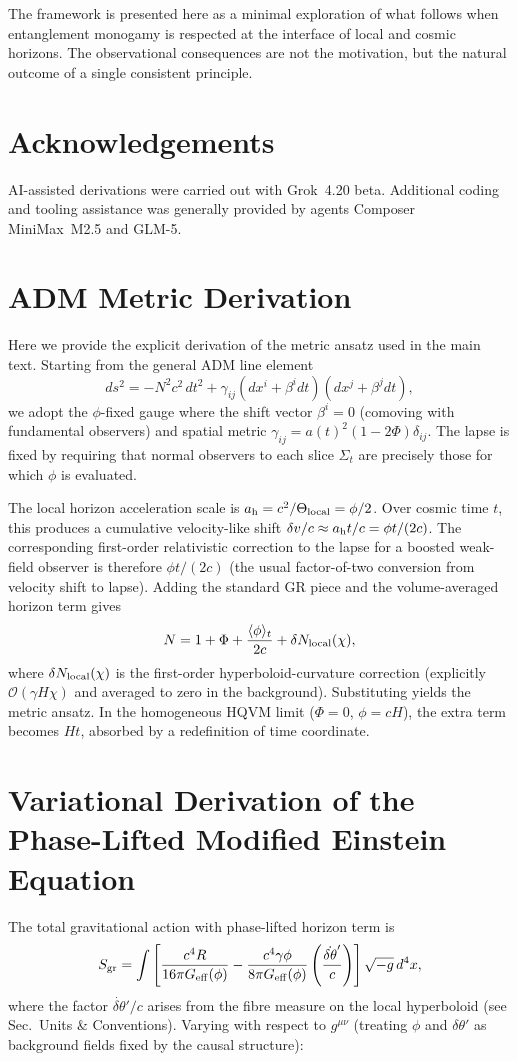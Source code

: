 \documentclass[12pt,a4paper]{article}
\begin{document}
The framework is presented here as a minimal exploration of what follows when entanglement monogamy is respected at the interface of local and cosmic horizons. The observational consequences are not the motivation, but the natural outcome of a single consistent principle.

\section*{Acknowledgements}
AI-assisted derivations were carried out with Grok~4.20 beta. Additional coding and tooling assistance was generally provided by agents  Composer MiniMax~M2.5 and GLM-5.

\appendix

\section{ADM Metric Derivation}
\label{app:adm}

Here we provide the explicit derivation of the metric ansatz used in the main text. Starting from the general ADM line element
\[
ds^2 = -N^2 c^2\,dt^2 + \gamma_{ij}(dx^i + \beta^i dt)(dx^j + \beta^j dt),
\]
we adopt the $\phi$-fixed gauge where the shift vector $\beta^i = 0$ (comoving with fundamental observers) and spatial metric $\gamma_{ij} = a(t)^2(1-2\Phi)\delta_{ij}$. The lapse is fixed by requiring that normal observers to each slice $\Sigma_t$ are precisely those for which $\phi$ is evaluated.

The local horizon acceleration scale is $a_{\rm h} = c^2/\Theta_{\rm local} = \phi/2$. Over cosmic time $t$, this produces a cumulative velocity-like shift $\delta v/c \approx a_{\rm h}t/c = \phi t/(2c)$. The corresponding first-order relativistic correction to the lapse for a boosted weak-field observer is therefore $\phi t/(2c)$ (the usual factor-of-two conversion from velocity shift to lapse). Adding the standard GR piece and the volume-averaged horizon term gives
\[
N = 1 + \Phi + \frac{\langle \phi \rangle_t}{2c} + \delta N_{\rm local}(\chi),
\]
where $\delta N_{\rm local}(\chi)$ is the first-order hyperboloid-curvature correction (explicitly $\mathcal{O}(\gamma H \chi)$ and averaged to zero in the background). Substituting yields the metric ansatz. In the homogeneous HQVM limit ($\Phi = 0$, $\phi = cH$), the extra term becomes $Ht$, absorbed by a redefinition of time coordinate.

\section{Variational Derivation of the Phase-Lifted Modified Einstein Equation}
\label{app:horizon-action}
The total gravitational action with phase-lifted horizon term is
\[
S_{\rm gr} = \int \left[ \frac{c^4 R}{16\pi G_{\rm eff}(\phi)} - \frac{c^4 \gamma \phi}{8\pi G_{\rm eff}(\phi)} \left( \frac{\dot{\delta\theta}'}{c} \right) \right] \sqrt{-g}\,d^4x,
\]
where the factor \(\dot{\delta\theta}'/c\) arises from the fibre measure on the local hyperboloid (see Sec.~Units \& Conventions). Varying with respect to \(g^{\mu\nu}\) (treating \(\phi\) and \(\delta\theta'\) as background fields fixed by the causal structure):
\end{document}
